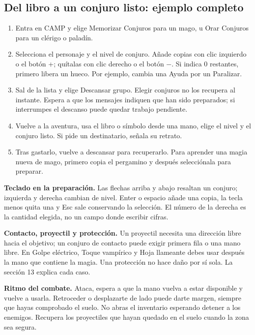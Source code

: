 \subsection*{Del libro a un conjuro listo: ejemplo completo}
\begin{enumerate}
\item Entra en CAMP y elige Memorizar Conjuros para un mago, u Orar Conjuros para un clérigo o paladín.
\item Selecciona el personaje y el nivel de conjuro. Añade copias con clic izquierdo o el botón +; quítalas con clic derecho o el botón $-$. Si indica 0 restantes, primero libera un hueco. Por ejemplo, cambia una Ayuda por un Paralizar.
\item Sal de la lista y elige Descansar grupo. Elegir conjuros no los recupera al instante. Espera a que los mensajes indiquen que han sido preparados; si interrumpes el descanso puede quedar trabajo pendiente.
\item Vuelve a la aventura, usa el libro o símbolo desde una mano, elige el nivel y el conjuro listo. Si pide un destinatario, señala su retrato.
\item Tras gastarlo, vuelve a descansar para recuperarlo. Para aprender una magia nueva de mago, primero copia el pergamino y después selecciónala para preparar.
\end{enumerate}

\textbf{Teclado en la preparación.} Las flechas arriba y abajo resaltan un conjuro; izquierda y derecha cambian de nivel. Enter o espacio añade una copia, la tecla menos quita una y Esc sale conservando la selección. El número de la derecha es la cantidad elegida, no un campo donde escribir cifras.

\textbf{Contacto, proyectil y protección.} Un proyectil necesita una dirección libre hacia el objetivo; un conjuro de contacto puede exigir primera fila o una mano libre. En Golpe eléctrico, Toque vampírico y Hoja llameante debes usar después la mano que contiene la magia. Una protección no hace daño por sí sola. La sección 13 explica cada caso.

\textbf{Ritmo del combate.} Ataca, espera a que la mano vuelva a estar disponible y vuelve a usarla. Retroceder o desplazarte de lado puede darte margen, siempre que hayas comprobado el suelo. No abras el inventario esperando detener a los enemigos. Recupera los proyectiles que hayan quedado en el suelo cuando la zona sea segura.
